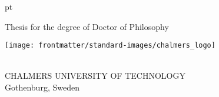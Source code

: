 {
 pt
\centering
\thispagestyle{empty}         %


\begin{normalsize}{\uppercase Thesis for the degree of Doctor of Philosophy}
\end{normalsize}


\vspace{3 cm}

{\large \textbf{\thesistitle} \par}
\vskip 1pc
{\large \thesissubtitle}
\vspace{1.5 cm}
\vspace{-10pt}

{\normalsize \MakeUppercase{\thesisauthor} \par}

\vspace{5 cm}

\texttt{[image: frontmatter/standard-images/chalmers\_logo]}
\vfill
\vspace{0.5 cm}

\thesisdepartment \\
{\scshape CHALMERS UNIVERSITY OF TECHNOLOGY} \\
Gothenburg, Sweden \thesisyear

\newpage
}
